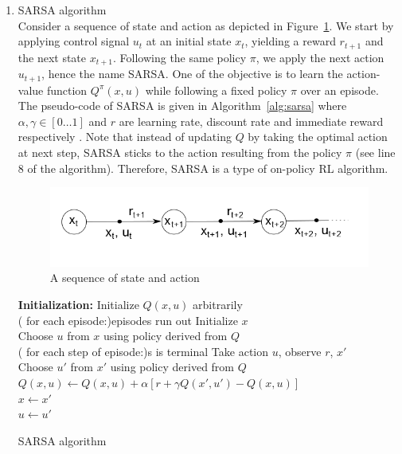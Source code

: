 \begin{enumerate}
	\item \ac{SARSA} algorithm \\
		Consider a sequence of state and action as depicted in Figure~\ref{fig:sarsa}. We start by applying control signal $ u_t $ at an initial state $ x_t $, yielding a reward $ r_{t+1} $ and the next state $ x_{t+1 }$. Following the same policy $\pi$, we apply the next action $ u_{t+1} $, hence the name \ac {SARSA}. One of the objective is to learn the action-value function $ Q^{\pi}(x,u) $ while following a fixed policy $ \pi $ over an episode. The pseudo-code of \ac{SARSA} is given in Algorithm~\ref{alg:sarsa} where $ \alpha, \gamma \in [0 \dots 1]$ and $r$ are learning rate, discount rate and immediate reward respectively \cite{sutton1998reinforcement}. Note that instead of updating $Q$ by taking the optimal action at next step, \ac {SARSA} sticks to the action resulting from the policy $\pi$ (see line 8 of the algorithm). Therefore, \ac {SARSA} is a type of on-policy \ac {RL} algorithm.
		
	
	\begin{figure}[h!]
		\centering
		\includegraphics[width=0.7\linewidth]{sarsa}
		\caption{A sequence of state and action}
		\label{fig:sarsa}
	\end{figure}
	
	\begin{algorithm}[H]
		\textbf{Initialization:} Initialize $ Q(x,u) $ arbitrarily\\
		\Repeat( for each episode:){episodes run out}{
			Initialize $ x $ \\
			Choose $ u $ from $ x $ using policy derived from $ Q $ \\
			\Repeat ( for each step of episode:){s is terminal}{
			Take action $ u $, observe $ r $, $ x' $ \\
			Choose $ u' $ from $ x' $ using policy derived from $ Q $ \\
			$ Q(x,u) \leftarrow Q(x,u) + \alpha[r+\gamma Q(x',u')-Q(x,u)] $	\\
			$ x \leftarrow  x' $\\
			$ u \leftarrow  u' $
						}
		} 		
		\label{alg:sarsa}
		\caption{SARSA algorithm}
	\end{algorithm}
	

\end{enumerate}
